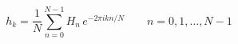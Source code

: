 \documentclass{article}
\begin{document}
\begin{equation*}
  h_k = \frac{1}{N} \sum_{n=0}^{N-1} H_n \, e^{-2\pi i k n/N} \qquad n =
  0, 1, \dots, N-1
\end{equation*}
\end{document}
